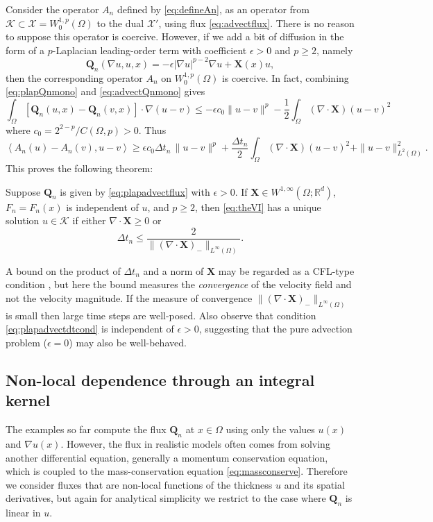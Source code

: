 \documentclass[final,onefignum]{siamart190516}
\newcommand\bQ{\mathbf{Q}}
\newcommand\bX{\mathbf{X}}
\newcommand{\Div}{\nabla\cdot}
\newcommand\eps{\epsilon}
\newcommand{\grad}{\nabla}
\newcommand{\ip}[2]{\ensuremath{\left<#1,#2\right>}}
\newcommand\RR{\mathbb{R}}
\begin{document}
Consider the operator $A_n$ defined by \eqref{eq:defineAn}, as an operator from $\mathcal{K} \subset \mathcal{X} = W_0^{1,p}(\Omega)$ to the dual $\mathcal{X}'$, using flux \eqref{eq:advectflux}.  There is no reason to suppose this operator is coercive.  However, if we add a bit of diffusion in the form of a $p$-Laplacian leading-order term with coefficient $\eps>0$ and $p\ge 2$, namely
\begin{equation}
  \bQ_n(\grad u,u,x) = -\eps |\grad u|^{p-2} \grad u + \bX(x) u,   \label{eq:plapadvectflux}
\end{equation}
then the corresponding operator $A_n$ on $W_0^{1,p}(\Omega)$ is coercive.  In fact, combining \eqref{eq:plapQnmono} and \eqref{eq:advectQnmono} gives
\begin{equation}
\int_\Omega \left[\bQ_n(u,x) - \bQ_n(v,x)\right] \cdot \grad (u - v) \le - \eps c_0 \|u-v\|^p - \frac{1}{2} \int_\Omega (\Div\bX) (u-v)^2
\end{equation}
where $c_0=2^{2-p}/C(\Omega,p)>0$.  Thus
\begin{equation}
\ip{A_n(u) - A_n(v)}{u-v} \ge \eps c_0 \Delta t_n\, \|u-v\|^p + \frac{\Delta t_n}{2} \int_\Omega (\Div\bX) (u-v)^2 + \|u-v\|_{L^2(\Omega)}^2.
\end{equation}
This proves the following theorem:

\begin{theorem}  \label{thm:plapadvectwellposed}  Suppose $\bQ_n$ is given by \eqref{eq:plapadvectflux} with $\eps>0$.  If $\bX \in W^{1,\infty}(\Omega;\RR^d)$, $F_n=F_n(x)$ is independent of $u$, and $p\ge 2$, then \eqref{eq:theVI} has a unique solution $u\in\mathcal{K}$ if either $\Div \bX \ge 0$ or
\begin{equation}
  \Delta t_n \le \frac{2}{\|(\Div \bX)_-\|_{L^\infty(\Omega)}}. \label{eq:plapadvectdtcond}
\end{equation}
\end{theorem}

A bound on the product of $\Delta t_n$ and a norm of $\bX$ may be regarded as a CFL-type condition \cite{LeVeque2002}, but here the bound measures the \emph{convergence} of the velocity field and not the velocity magnitude.  If the measure of convergence $\|(\Div \bX)_-\|_{L^\infty(\Omega)}$ is small then large time steps are well-posed.  Also observe that condition \eqref{eq:plapadvectdtcond} is independent of $\eps>0$, suggesting that the pure advection problem ($\eps = 0$) may also be well-behaved.

\subsection{Non-local dependence through an integral kernel} \label{subsec:nonlocal}   The examples so far compute the flux $\bQ_n$ at $x\in\Omega$ using only the values $u(x)$ and $\grad u(x)$.  However, the flux in realistic models often comes from solving another differential equation, generally a momentum conservation equation, which is coupled to the mass-conservation equation \eqref{eq:massconserve}.  Therefore we consider fluxes that are non-local functions of the thickness $u$ and its spatial derivatives, but again for analytical simplicity we restrict to the case where $\bQ_n$ is linear in $u$.
\end{document}
